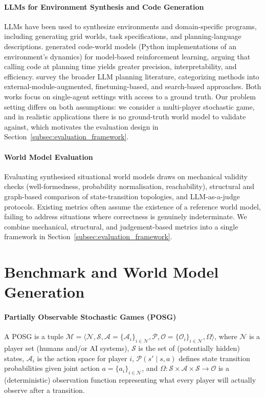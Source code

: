 \documentclass{article}
\begin{document}
\paragraph{LLMs for Environment Synthesis and Code Generation}
LLMs have been used to synthesize environments and domain-specific programs, including generating grid worlds, task specifications, and planning-language descriptions. \citet{dainese2024generating} generated code-world models (Python implementations of an environment's dynamics) for model-based reinforcement learning, arguing that calling code at planning time yields greater precision, interpretability, and efficiency. \citet{cao2025large} survey the broader LLM planning literature, categorizing methods into external-module-augmented, finetuning-based, and search-based approaches. Both works focus on single-agent settings with access to a ground truth. Our problem setting differs on both assumptions: we consider a multi-player stochastic game, and in realistic applications there is no ground-truth world model to validate against, which motivates the evaluation design in Section~\ref{subsec:evaluation_framework}.

\paragraph{World Model Evaluation}
Evaluating synthesised situational world models draws on mechanical validity checks (well-formedness, probability normalisation, reachability), structural and graph-based comparison of state-transition topologies, and LLM-as-a-judge protocols. Existing metrics often assume the existence of a reference world model, failing to address situations where correctness is genuinely indeterminate. We combine mechanical, structural, and judgement-based metrics into a single framework in Section~\ref{subsec:evaluation_framework}.

\section{Benchmark and World Model Generation}
\label{sec:method}

\label{subsec:preliminaries}

\paragraph{Partially Observable Stochastic Games (POSG)}
A POSG is a tuple $\mathcal{M} = \langle \mathcal{N}, \mathcal{S}, \mathcal{A}=\{\mathcal{A}_i\}_{i \in \mathcal{N}}, \mathcal{P}, \mathcal{O}=\{\mathcal{O}_i\}_{i \in \mathcal{N}}, \Omega \rangle$, where $\mathcal{N}$ is a player set (humans and/or AI systems),
$\mathcal{S}$ is the set of (potentially hidden) states, $\mathcal{A}_i$ is the action space for player $i$, $\mathcal{P}(s' \mid s, a)$ defines state transition probabilities given joint action $a=\{a_i\}_{i\in\mathcal N}$, and $\Omega:\mathcal S\times\mathcal A\times\mathcal S\to\mathcal O$ is a (deterministic) observation function representing what every player will actually observe after a transition.
\end{document}
